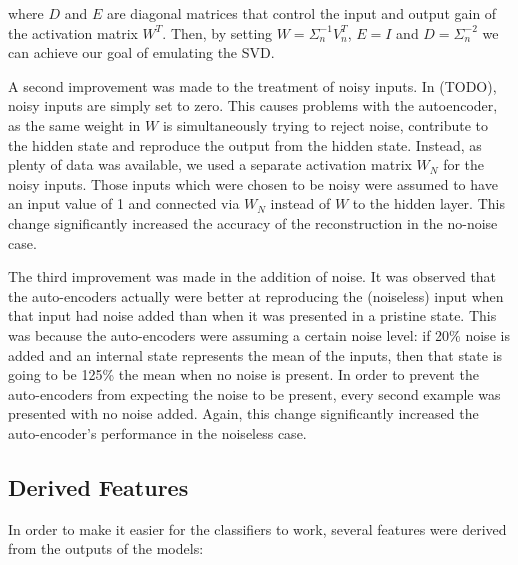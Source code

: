 \documentclass{article}
\begin{document}
where $D$ and $E$ are diagonal matrices that control the input and output gain of the activation matrix $W^T$.  Then, by setting $W = \Sigma_n^{-1} V_n^T$, $E = I$ and $D = \Sigma_n^{-2}$ we can achieve our goal of emulating the SVD.

A second improvement was made to the treatment of noisy inputs.  In (TODO), noisy inputs are simply set to zero.  This causes problems with the autoencoder, as the same weight in $W$ is simultaneously trying to reject noise, contribute to the hidden state and reproduce the output from the hidden state.  Instead, as plenty of data was available, we used a separate activation matrix $W_N$ for the noisy inputs.  Those inputs which were chosen to be noisy were assumed to have an input value of 1 and connected via $W_N$ instead of $W$ to the hidden layer.  This change significantly increased the accuracy of the reconstruction in the no-noise case.

The third improvement was made in the addition of noise.  It was observed that the auto-encoders actually were better at reproducing the (noiseless) input when that input had noise added than when it was presented in a pristine state.  This was because the auto-encoders were assuming a certain noise level: if 20\% noise is added and an internal state represents the mean of the inputs, then that state is going to be 125\% the mean when no noise is present.  In order to prevent the auto-encoders from expecting the noise to be present, every second example was presented with no noise added.  Again, this change significantly increased the auto-encoder's performance in the noiseless case.

\subsection{Derived Features}

In order to make it easier for the classifiers to work, several features were derived from the outputs of the models:
\end{document}
